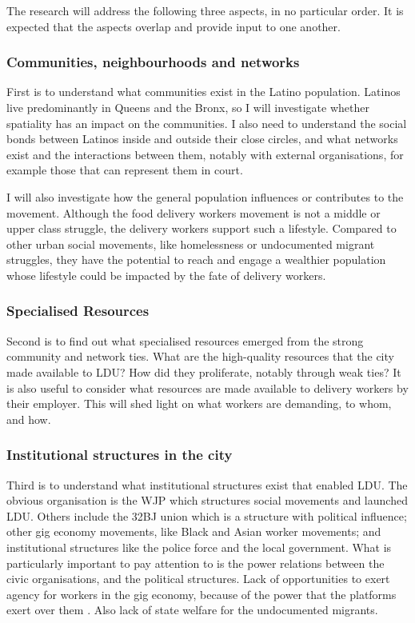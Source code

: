 \documentclass{article}
\begin{document}
The research will address the following three aspects, in no particular order. It is expected that the aspects overlap and provide input to one another.

\subsubsection{Communities, neighbourhoods and networks}

First is to understand what communities exist in the Latino population. Latinos live predominantly in Queens and the Bronx, so I will investigate whether spatiality has an impact on the communities. I also need to understand the social bonds between Latinos inside and outside their close circles, and what networks exist and the interactions between them, notably with external organisations, for example those that can represent them in court.

I will also investigate how the general population influences or contributes to the movement. Although the food delivery workers movement is not a middle or upper class struggle, the delivery workers support such a lifestyle. Compared to other urban social movements, like homelessness or undocumented migrant struggles, they have the potential to reach and engage a wealthier population whose lifestyle could be impacted by the fate of delivery workers. 

\subsubsection{Specialised Resources}

Second is to find out what specialised resources emerged from the strong community and network ties. What are the high-quality resources that the city made available to LDU? How did they proliferate, notably through weak ties?
It is also useful to consider what resources are made available to delivery workers by their employer. This will shed light on what workers are demanding, to whom, and how.

\subsubsection{Institutional structures in the city}

Third is to understand what institutional structures exist that enabled LDU. The obvious organisation is the WJP which structures social movements and launched LDU. Others include the 32BJ union which is a structure with political influence; other gig economy movements, like Black and Asian worker movements; and institutional structures like the police force and the local government. What is particularly important to pay attention to is the power relations between the civic organisations, and the political structures.
Lack of opportunities to exert agency for workers in the gig economy, because of the power that the platforms exert over them \parencite{anwar2020hidden}. Also lack of state welfare for the undocumented migrants.
\end{document}

